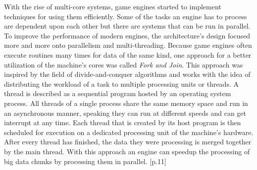 With the rise of multi-core systems, game engines started to implement techniques for using them efficiently. Some of the tasks an engine has to process are dependent upon each other but there are systems that can be run in parallel. To improve the performance of modern engines, the architecture's design focused more and more onto parallelism and multi-threading. Because game engines often execute routines many times for data of the same kind, one approach for a better utilization of the machine's cores was called \textit{Fork and Join}. This approach was inspired by the field of divide-and-conquer algorithms and works with the idea of distributing the workload of a task to multiple processing units or threads. A thread is described as a sequential program hosted by an operating system process. All threads of a single process share the same memory space and run in an asynchronous manner, speaking they can run at different speeds and can get interrupt at any time. Each thread that is created by its host program is then scheduled for execution on a dedicated processing unit of the machine's hardware. After every thread has finished, the data they were processing is merged together by the main thread. With this approach an engine can speedup the processing of big data chunks by processing them in parallel. \cite{Portisch17}[p.11]

